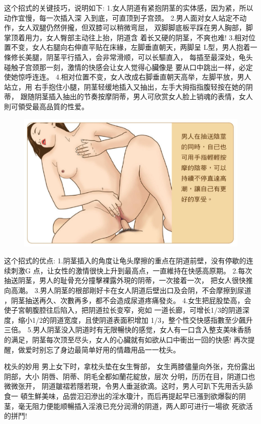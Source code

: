 \documentclass[12pt,UTF8]{ctexbook}
\begin{document}
这个招式的关键技巧，说明如下:
1.女人阴道有紧抱阴茎的实体感，因为紧，所以动作宜慢，每一次插入深
入到底，可直顶到子宫颈。
2.男人面对女人站定不动作，女人双腿仍然併攏，但双膝可以稍微弯屈，
双脚脚底板平踩在男人胸部，脚掌顶着用力，女人臀部主动往上抬，阴道含
着长又硬的阴茎，不爽也难!
3.相对位置不变，女人右腿向右伸直平贴在床緣，左脚垂直朝天，两脚呈
L型，男人抱着一條修长美腿，阴茎平行插入，会非常滑顺，可以长驅直入，
每插至最深处，龟头碰触子宫颈那一刻，激情的快感会让女人觉得心臟像是
要从口中跳出一样，必定使她惊呼连连。
4.相对位置不变，女人改成右脚垂直朝天高举，左脚平放，男人站立，用
右手抱住小腿，阴茎轻缓地插入又抽出，左手大拇指指腹轻按在她的阴蒂，
跟随阴茎插入抽出的节奏按摩阴蒂，男人可欣赏女人脸上销魂的表情，女人
則可領受最高品質的性爱。

\begin{figure}[htbp]
	\centering
	\includegraphics[width=0.7\linewidth]{31}
	\caption{}
	\label{fig:1}
\end{figure}

这个招式的优点:
1.阴茎插入的角度让龟头摩擦的重点在阴道前壁，没有停歇的连续刺激G
点，让女性的激情很快上升到最高点，一直維持在快感高原期。
2.每次抽送阴茎，男人的耻骨充分撞擊裸露外現的阴蒂，一次接着一次，
把女人很快推向高潮。
3.男人阴茎的根部剛好卡在女人阴道后壁出口及会阴，不会摩擦到尿道
，阴茎抽送再久、次數再多，都不会造成尿道疼痛發炎。
4.女生把屁股垫高，会使子宮朝腹腔往后陷入，把阴道拉长变窄，宛如
一道长廊，可增长1/3的阴道深度，缩小1/2的阴道宽度，且使阴道表面积增加
1/3，整个性交快感指數至少飆升三倍。
5.男人阴茎没入阴道时有无限暢快的感觉，女人有一口含入整支美味香肠
的满足，阴茎每次顶至尽头，女人的心臟就有如欲从口中衝出一回的快感!
再次提醒，做爱时别忘了身边最简单好用的情趣用品一一枕头。

枕头的妙用
男上女下时，拿枕头垫在女生臀部，
女生两膝儘量向外张，充份露出阴部，大小
阴唇、阴蒂、阴毛全都如蘭花綻放，层次
分明，历历在目，阴道口也微微张开，
阴道皺褶若隱若現，令男人垂涎欲滴。这时，男人可趴下先用舌头舔食一
頓生鮮美味，品尝汩汩滲出的淫水瓊汁，而后再提起早已漲到欲爆裂的阴
茎，毫无阻力便能顺暢插入淫液已充分润滑的阴道，两人即可进行一場欲
死欲活的拼鬥!
\end{document}
